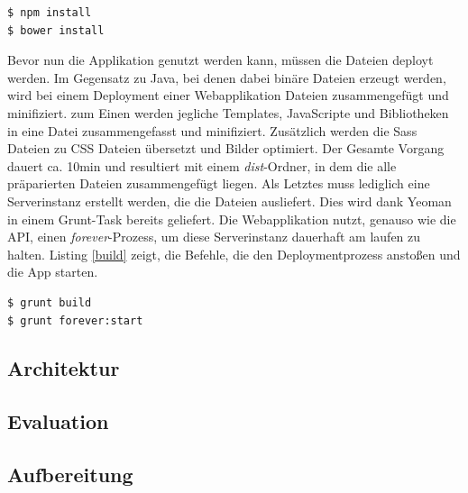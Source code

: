 \vspace{1cm}
\begin{lstlisting}[caption=Installation der Zusatzbibliotheken für die Webapplikation,label=installDependencies]
$ npm install
$ bower install
\end{lstlisting}
\vspace{1cm}

Bevor nun die Applikation genutzt werden kann, müssen die Dateien deployt werden. Im Gegensatz zu Java, bei denen dabei binäre Dateien erzeugt werden, wird bei einem Deployment einer Webapplikation Dateien zusammengefügt und minifiziert. zum Einen werden jegliche Templates, JavaScripte und Bibliotheken in eine Datei zusammengefasst und minifiziert. Zusätzlich werden die Sass Dateien zu CSS Dateien übersetzt und Bilder optimiert. Der Gesamte Vorgang dauert ca. 10min und resultiert mit einem \textit{dist}-Ordner, in dem die alle präparierten Dateien zusammengefügt liegen. Als Letztes muss lediglich eine Serverinstanz erstellt werden, die die Dateien ausliefert. Dies wird dank Yeoman in einem Grunt-Task bereits geliefert. Die Webapplikation nutzt, genauso wie die API, einen \textit{forever}-Prozess, um diese Serverinstanz dauerhaft am laufen zu halten. Listing \ref{build} zeigt, die Befehle, die den Deploymentprozess anstoßen und die App starten.

\vspace{1cm}
\begin{lstlisting}[caption=Deployment und Start der Webapplikation,label=build]
$ grunt build
$ grunt forever:start
\end{lstlisting}
\vspace{1cm}

\subsection{Architektur}

\subsection{Evaluation}
\label{evaluation}

\subsection{Aufbereitung}

